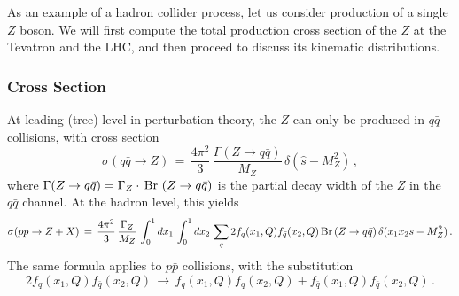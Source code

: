 \documentclass{ws-procs9x6}
\def\beq{\begin{equation}}
\def\eeq#1{\label{#1}\end{equation}}
\begin{document}
As an example of a hadron collider process, let us consider production of a single $Z$ boson. We will first compute the total production cross section of the $Z$ at the Tevatron and the LHC, and then proceed to discuss its kinematic distributions.

\subsubsection{Cross Section}

At leading (tree) level in perturbation theory, the $Z$ can only be produced in $q\bar{q}$ collisions, with cross section 
\beq
\sigma(q\bar{q}\to Z)\,=\,\frac{4\pi^2}{3}\,\frac{\Gamma(Z\to q\bar{q})}{M_Z}\,\delta(\hat{s}-M_Z^2)\,,
\eeq{Zparton_xsec}
where $\Gamma(Z\to q\bar{q})=\Gamma_Z \cdot\,{\rm Br}~(Z\to q\bar{q})$ is the partial decay width of the $Z$ in the $q\bar{q}$ channel. At the hadron level, this yields
\beq
\sigma(pp\to Z+X) \,=\, \frac{4\pi^2}{3}\,\frac{\Gamma_Z}{M_Z}\,\int_0^1 dx_1\,\int_0^1 dx_2 \, \sum_q 2 f_q(x_1, Q) f_{\bar{q}}(x_2,Q)\, {\rm Br}\,(Z\to q\bar{q}) \,\delta(x_1x_2s-M_Z^2)\,. 
\eeq{Zproton_xsec1}
The same formula applies to $p\bar{p}$ collisions, with the substitution
\beq
2 f_q(x_1, Q) f_{\bar{q}}(x_2,Q) \,\longrightarrow\,  f_q(x_1, Q) f_q (x_2,Q) +f_{\bar{q}}(x_1, Q) f_{\bar{q}}(x_2,Q) \,.
\eeq{ppbar_subst}
\end{document}
